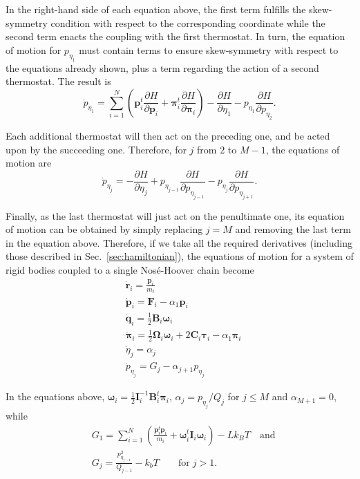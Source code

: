 \documentclass[aip,jcp,reprint,amsmath,amssymb,raggedbottom]{revtex4-1}
\newcommand{\mt}[1]{\boldsymbol{\mathbf{#1}}}           %
\newcommand{\vt}[1]{\boldsymbol{\mathbf{#1}}}           %
\newcommand{\tr}[1]{#1^t}                               %
\newcommand{\diff}[2]{\dfrac{\partial #1}{\partial #2}} %
\begin{document}
In the right-hand side of each equation above, the first term fulfills the skew-symmetry condition with respect to the corresponding coordinate while the second term enacts the coupling with the first thermostat. In turn, the equation of motion for $p_{\eta_1}$ must contain terms to ensure skew-symmetry with respect to the equations already shown, plus a term regarding the action of a second thermostat. The result is
\[
{\dot p}_{\eta_1} = \sum_{i=1}^N \left( \tr{\vt p_i} \diff{H}{\vt p_i} + \tr{\vt \pi_i} \diff{H}{\vt \pi_i}\right) - \diff{H}{\eta_1} - p_{\eta_1} \diff{H}{p_{\eta_2}}.
\]

Each additional thermostat will then act on the preceding one, and be acted upon by the succeeding one. Therefore, for $j$ from $2$ to $M-1$, the equations of motion are
\[
{\dot p}_{\eta_j} = -\diff{H}{\eta_j} + p_{\eta_{j-1}} \diff{H}{p_{\eta_{j-1}}} - p_{\eta_j} \diff{H}{p_{\eta_{j+1}}}.
\]

Finally, as the last thermostat will just act on the penultimate one, its equation of motion can be obtained by simply replacing $j = M$ and removing the last term in the equation above. Therefore, if we take all the required derivatives (including those described in Sec.~\ref{sec:hamiltonian}), the equations of motion for a system of rigid bodies coupled to a single Nos\'{e}-Hoover chain become
\begin{subequations}
\label{eq:nhc_system}
\begin{align}
&\dot{\vt r}_i = \frac{{\vt p}_i}{m_i} \\ 
&\dot{\vt p}_i = {\vt F}_i - \alpha_1 \vt p_i \\
&\dot{\vt q}_i = \frac{1}{2} \mt B_i \vt \omega_i \label{eq:nhc_q} \\
&\dot{\vt \pi}_i = \frac{1}{2} \mt \Omega_i \vt \omega_i + 2 \mt C_i \vt \tau_i - \alpha_1 \vt \pi_i \label{eq:nhc_pi} \\
&\dot{\eta}_j = \alpha_j \\
&{\dot p}_{\eta_j} = G_j - \alpha_{j+1} p_{\eta_j}
\end{align}
\end{subequations}

In the equations above, ${\vt \omega}_i = \frac{1}{2} {\mt I}_i^{-1} \tr{\mt B}_i {\vt \pi}_i$, $\alpha_j = {p_{\eta_j}}/{Q_j}$ for $j \leq M$ and $\alpha_{M+1} = 0$, while
\begin{align*}
&G_1 = \sum_{i=1}^N \left( \frac{\tr{\vt p}_i{\vt p}_i}{m_i} + \tr{\vt \omega}_i \mt I_i \vt \omega_i \right) - L k_B T \quad \text{and}\\
&G_j = \frac{p_{\eta_{j-1}}^2}{Q_{j-1}} - k_b T \qquad \text{for} \; j > 1.
\end{align*}
\end{document}
